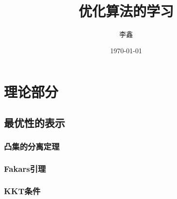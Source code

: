 \documentclass[UTF8]{ctexbook}
\begin{document}
\title{优化算法的学习}

\author{李鑫}

\date{\today}

\maketitle
\tableofcontents

\mainmatter %

\part{理论部分}

\chapter{最优性的表示}

\section{凸集的分离定理}

\section{Fakars引理}

\section{KKT条件}
\end{document}

